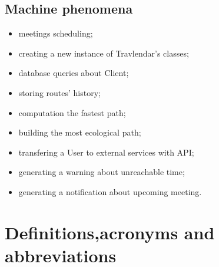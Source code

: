 \documentclass[a4paper,leqno]{book}
\begin{document}
\subsection{Machine phenomena}
\begin{itemize}
	\item meetings scheduling;
	\item creating a new instance of Travlendar's classes;
	\item database queries about Client;
	\item storing routes' history;
	\item computation the fastest path;
	\item building the most ecological path;
	\item transfering a User to external services with API;
	\item generating a warning about unreachable time;
	\item generating a notification about upcoming meeting.
\end{itemize}

\section{Definitions,acronyms and abbreviations}
\end{document}

